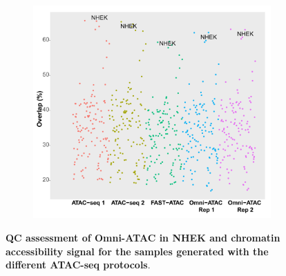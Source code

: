 \begin{figure}[htbp]
\begin{subfigure}{0.5\textwidth}
\caption{\textbf{}}
\end{subfigure}
\begin{subfigure}{0.5\textwidth}
\centering
\includegraphics[width=\textwidth]{./Results1/pdfs/ENCODE_125_cell_types_overlap_FAST_ATAC_Omni_ATAC_qval_2}
\caption{\textbf{}} %
\end{subfigure}%
\caption[QC assessment of Omni-ATAC in NHEK and chromatin accessibility signal for the samples generated with the different ATAC-seq protocols]{\textbf{QC assessment of Omni-ATAC in NHEK and chromatin accessibility signal for the samples generated with the different ATAC-seq protocols}.\\}
\label{fig:Omni_ATAC_NHEK_QC_assessment_and_all_tracks}
\end{figure} 
